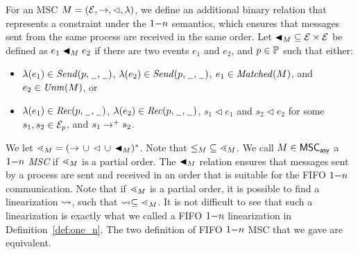 \begin{definition} \label{def:one_n_alt}
	For an MSC $M = (\mathcal{E},\to,\lhd,\lambda)$, we define
	an additional binary relation that represents a constraint
	under the $1\mathsf{-}n$ semantics, which ensures that messages sent from the same process are received in the same order. Let ${\blacktriangleleft}_M \subseteq \mathcal{E} \times \mathcal{E}$ be defined as $e_1 \blacktriangleleft_M e_2$ if there are two events $e_1$ and $e_2$, and $p \in \mathbb{P}$ such that either:
	\begin{itemize}\itemsep=0.5ex
		\item $\lambda(e_1) \in {\mathit{Send}(p,\hspace{0.1em}\underline{\hspace{0.5em}}\hspace{0.1em},\hspace{0.1em}\underline{\hspace{0.5em}}\hspace{0.1em})}$, $\lambda(e_2) \in {\mathit{Send}(p,\hspace{0.1em}\underline{\hspace{0.5em}}\hspace{0.1em},\hspace{0.1em}\underline{\hspace{0.5em}}\hspace{0.1em})}$, $e_1 \in \mathit{Matched}(M)$, and $e_2 \in \mathit{Unm}(M)$, or
		\item $\lambda(e_1) \in {\mathit{Rec}(p,\hspace{0.1em}\underline{\hspace{0.5em}}\hspace{0.1em},\hspace{0.1em}\underline{\hspace{0.5em}}\hspace{0.1em})}$, $\lambda(e_2) \in {\mathit{Rec}(p,\hspace{0.1em}\underline{\hspace{0.5em}}\hspace{0.1em},\hspace{0.1em}\underline{\hspace{0.5em}}\hspace{0.1em})}$, $s_1 \lhd e_1$ and $s_2 \lhd e_2$ for some $s_1,s_2 \in \mathcal{E}_p$, and $s_1 \to^+ s_2$.
	\end{itemize}
	
	We let ${\lessdot_M} = ({\to} \,\cup\, {\lhd} \,\cup\, {\blacktriangleleft_M})^\ast$.
	Note that ${\le_M} \subseteq {\lessdot_M}$.
	We call $M \in \mathsf{MSC}_{\mathsf{asy}}$ a \emph{$1\mathsf{-}n$ MSC}
	if ${\lessdot_M}$ is a partial order. The ${\blacktriangleleft}_M$ relation ensures that messages sent by a process are sent and received in an order that is suitable for the FIFO $1\mathsf{-}n$ communication. Note that if ${\lessdot_M}$ is a partial order, it is possible to find a linearization $\rightsquigarrow$, such that $\rightsquigarrow \subseteq \lessdot_M$. It is not difficult to see that such a linearization is exactly what we called a FIFO $1\mathsf{-}n$ linearization in Definition~\ref{def:one_n}. The two definition of FIFO $1\mathsf{-}n$ MSC that we gave are equivalent.
\end{definition}


